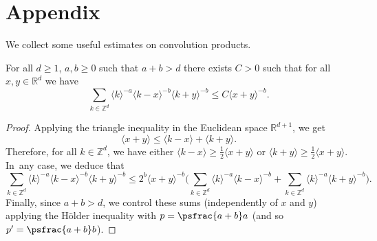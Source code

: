\section{Appendix}
We collect some useful estimates on convolution products.
\begin{lemma}
\label{lem_conv1}
For all $d\geq 1$, $a,b\geq 0$ such that $a+b>d$ there exists $C>0$ such that for all $x,y\in \mathbb{R}^d$ we have
\[
\sum_{k\in \mathbb{Z}^d} \langle k \rangle^{-a} \langle k-x \rangle^{-b} \langle k+ y\rangle^{-b} \leq C \langle x+y\rangle^{-b}.
\]
\end{lemma}
\begin{proof} Applying the triangle inequality in the Euclidean space $\mathbb{R}^{d+1}$, we get
\[
\langle x+y \rangle \leq \langle k-x \rangle + \langle k+ y\rangle.
\]
Therefore, for all $k\in \mathbb{Z}^d$, we have either $\langle k-x \rangle\geq \frac12 \langle x+y \rangle$ or $\langle k+y \rangle\geq \frac12 \langle x+y \rangle$. In~any case, we deduce that
\[
\sum_{k\in \mathbb{Z}^d} \langle k \rangle^{-a} \langle k-x \rangle^{-b} \langle k+ y\rangle^{-b} \leq 2^{b} \langle x+y\rangle^{-b} \biggl(\sum_{k\in \mathbb{Z}^d} \langle k \rangle^{-a} \langle k-x \rangle^{-b} + \sum_{k\in \mathbb{Z}^d} \langle k \rangle^{-a} \langle k+y \rangle^{-b} \biggr).
\]
Finally, since $a+b>d$, we control these sums (independently of $x$ and $y$) applying the Hölder inequality with $p = \psfrac{a+b}a$ (and so $p'= \psfrac{a+b}b$).
\end{proof}

